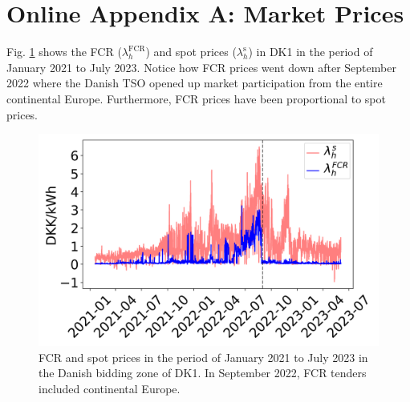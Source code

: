 \documentclass[conference]{IEEEtran}
\begin{document}

\vspace{-1mm}

%


\newpage

\section*{Online Appendix A: Market Prices}\label{app:market-prices}


Fig. \ref{fig:fcr_prices_2022} shows the FCR ($\lambda_{h}^{\text{FCR}}$) and spot prices ($\lambda_{h}^{\text{s}}$) in DK1 in the period of January 2021 to July 2023. Notice how FCR prices went down after September 2022 where the Danish TSO opened up market participation from the entire continental Europe. Furthermore, FCR prices have been proportional to spot prices.

\begin{figure}[t]
    \centering
    \includegraphics[width=\columnwidth]{../figures/fcr_prices.png}
    \caption{\small{FCR and spot prices in the period of January 2021 to July 2023 in the Danish bidding zone of DK1. In September 2022, FCR tenders included continental Europe.}}
    \label{fig:fcr_prices_2022}
\end{figure}
\end{document}

